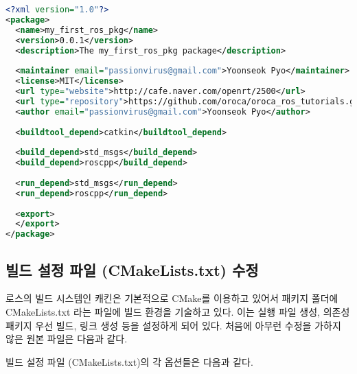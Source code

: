 \begin{lstlisting}[language=XML]
<?xml version="1.0"?>
<package>
  <name>my_first_ros_pkg</name>
  <version>0.0.1</version>
  <description>The my_first_ros_pkg package</description>
 
  <maintainer email="passionvirus@gmail.com">Yoonseok Pyo</maintainer>
  <license>MIT</license>
  <url type="website">http://cafe.naver.com/openrt/2500</url>
  <url type="repository">https://github.com/oroca/oroca_ros_tutorials.git</url>
  <author email="passionvirus@gmail.com">Yoonseok Pyo</author>
 
  <buildtool_depend>catkin</buildtool_depend>
 
  <build_depend>std_msgs</build_depend>
  <build_depend>roscpp</build_depend>
 
  <run_depend>std_msgs</run_depend>
  <run_depend>roscpp</run_depend>
 
  <export>
  </export>
</package>
\end{lstlisting}

\subsection{빌드 설정 파일 (CMakeLists.txt) 수정}

로스의 빌드 시스템인 캐킨은 기본적으로 CMake를 이용하고 있어서 패키지 폴더에 CMakeLists.txt 라는 파일에 빌드 환경을 기술하고 있다. 이는 실행 파일 생성, 의존성 패키지 우선 빌드, 링크 생성 등을 설정하게 되어 있다. 처음에 아무런 수정을 가하지 않은 원본 파일은 다음과 같다.



\noindent
빌드 설정 파일 (CMakeLists.txt)의 각 옵션들은 다음과 같다.

